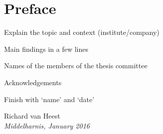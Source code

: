 \chapter*{Preface}

\itemize
	\item Explain the topic and context (institute/company)
	\item Main findings in a few lines
	\item Names of the members of the thesis committee
	\item Acknowledgements
	\item Finish with ‘name’ and ‘date’

\begin{flushright}
Richard van Heest\\
\emph{Middelharnis, January 2016}
\end{flushright}
\clearpage